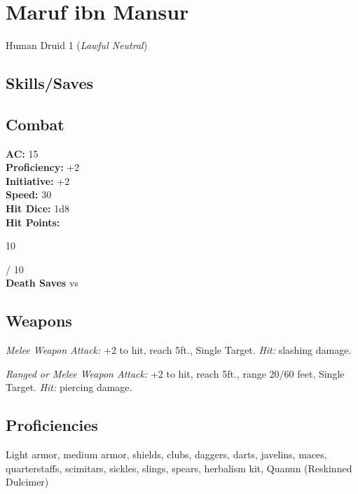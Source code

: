 \documentclass[letterpaper,10pt,twoside,twocolumn,openany]{book}
\begin{document}
\section{Maruf ibn Mansur}

Human Druid 1 (\textit{Lawful Neutral})

\subsection{Skills/Saves}
\saves[
    STR=\stat{9},
    DEX=\stat{15},
    CON=\stat{16},
    INT=\stat{10},
    WIS=\stat{16},
    CHA=\stat{10},
    NATURE=1,
    SURVIVAL=1,
    INSIGHT=1,
    PERCEPTION=1,
]

\subsection{Combat}
\begingroup
  \unskip\color{titlered}
  \textbf{AC:} 15\\
  \textbf{Proficiency:} +2\\
  \textbf{Initiative:} +2 \\
  \textbf{Speed:} 30 \\
  \textbf{Hit Dice:} 1d8 \Circle \\
	\textbf{Hit Points:} \parbox[l][1em][c]{1em}{10} / 10 \\
  \textbf{Death Saves} \Circle \Circle \Circle vs \Circle \Circle \Circle
\endgroup

\subsection{Weapons}
\begingroup
  \begin{monsteraction}[Scimitar]
    \textit{Melee Weapon Attack:} +2 to hit, reach 5ft., Single Target. \textit{Hit:}  slashing damage.
  \end{monsteraction}

  \begin{monsteraction}[Dagger]
    \textit{Ranged or Melee Weapon Attack:} +2 to hit, reach 5ft., range 20/60 feet, Single Target. \textit{Hit:}  piercing damage.
  \end{monsteraction}
\endgroup%

\subsection{Proficiencies}
Light armor, medium armor, shields, clubs, daggers, darts, javelins, maces, quarterstaffs, scimitars, sickles, slings, spears, herbalism kit, Quanun (Reskinned Dulcimer)
\end{document}
